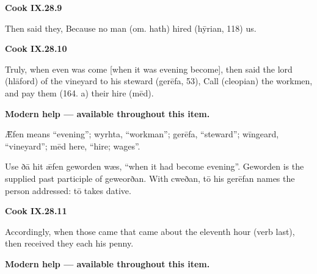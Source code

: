 \par\begin{minipage}{\linewidth}\raggedright
\textbf{Cook IX.28.9}

Then said they, Because no man (om. hath) hired (hȳrian, 118) us.

\end{minipage}\par\addvspace{4pt}

\par\begin{minipage}{\linewidth}\raggedright
\textbf{Cook IX.28.10}

Truly, when even was come [when it was evening become], then said the lord (hlāford) of the vineyard to his steward (gerēfa, 53), Call (cleopian) the workmen, and pay them (164. a) their hire (mēd).

\textbf{Modern help — available throughout this item.}



Ǣfen means “evening”; wyrhta, “workman”; gerēfa, “steward”; wīngeard, “vineyard”; mēd here, “hire; wages”.
\end{minipage}\par\addvspace{4pt}

Use ðā hit ǣfen geworden wæs, “when it had become evening”. Geworden is the supplied past participle of geweorðan. With cweðan, tō his gerēfan names the person addressed: tō takes dative.

\par\begin{minipage}{\linewidth}\raggedright
\textbf{Cook IX.28.11}

Accordingly, when those came that came about the eleventh hour (verb last), then received they each his penny.

\textbf{Modern help — available throughout this item.}

\end{minipage}\par\addvspace{4pt}

